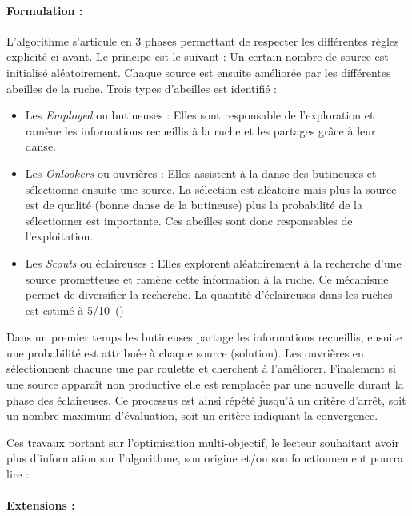 \paragraph{Formulation :} %
\label{par:formulation}
L’algorithme s’articule en 3 phases permettant de respecter les différentes règles
explicité ci-avant. Le principe est le suivant : Un certain nombre de source est
initialisé aléatoirement. Chaque source est ensuite améliorée par les différentes
abeilles de la ruche. Trois types d’abeilles est identifié :
\begin{itemize}
  \item Les \emph{Employed} ou butineuses : Elles sont responsable de l’exploration
        et ramène les informations recueillis à la ruche et les partages grâce à
        leur danse.
  \item Les \emph{Onlookers} ou ouvrières : Elles assistent à la danse des butineuses
        et sélectionne ensuite une source. La sélection est aléatoire mais plus
        la source est de qualité (bonne danse de la butineuse) plus la probabilité
        de la sélectionner est importante. Ces abeilles sont donc responsables
        de l’exploitation.
  \item Les \emph{Scouts} ou éclaireuses : Elles explorent aléatoirement à la recherche
        d’une source prometteuse et ramène cette information à la ruche. Ce mécanisme
        permet de diversifier la recherche. La quantité d’éclaireuses dans les ruches
        est estimé à 5/10~\percent (\cite{Seeley1996})
\end{itemize}
Dans un premier temps les butineuses partage les informations recueillis, ensuite
une probabilité est attribuée à chaque source (solution). Les ouvrières en sélectionnent
chacune une par roulette et cherchent à l’améliorer. Finalement si une source apparaît
non productive elle est remplacée par une nouvelle durant la phase des éclaireuses.
Ce processus est ainsi répété jusqu’à un critère d’arrêt, soit un nombre maximum
d’évaluation, soit un critère indiquant la convergence.


Ces travaux portant sur l’optimisation multi-objectif, le lecteur souhaitant avoir
plus d’information sur l’algorithme, son origine et/ou son fonctionnement pourra
lire : \cite{Karaboga201221,Aboul-EllaHassanien2015}.

\paragraph{Extensions :} %
\label{par:extensions}

